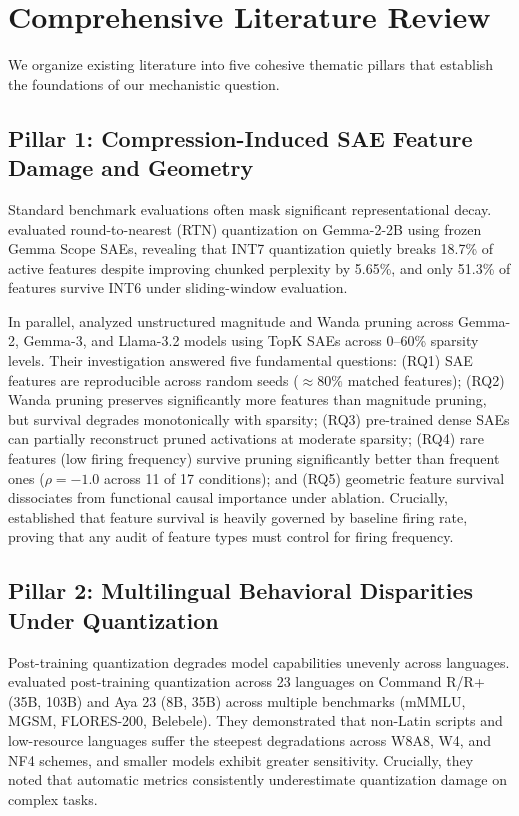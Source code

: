 \documentclass[11pt]{article}
\begin{document}
\section{Comprehensive Literature Review}
We organize existing literature into five cohesive thematic pillars that establish the foundations of our mechanistic question.

\subsection{Pillar 1: Compression-Induced SAE Feature Damage and Geometry}
Standard benchmark evaluations often mask significant representational decay. \citet{duan2026perplexity} evaluated round-to-nearest (RTN) quantization on Gemma-2-2B using frozen Gemma Scope SAEs, revealing that INT7 quantization quietly breaks 18.7\% of active features despite improving chunked perplexity by 5.65\%, and only 51.3\% of features survive INT6 under sliding-window evaluation. 

In parallel, \citet{borobia2026how} analyzed unstructured magnitude and Wanda pruning across Gemma-2, Gemma-3, and Llama-3.2 models using TopK SAEs across 0--60\% sparsity levels. Their investigation answered five fundamental questions: (RQ1) SAE features are reproducible across random seeds ($\approx 80\%$ matched features); (RQ2) Wanda pruning preserves significantly more features than magnitude pruning, but survival degrades monotonically with sparsity; (RQ3) pre-trained dense SAEs can partially reconstruct pruned activations at moderate sparsity; (RQ4) rare features (low firing frequency) survive pruning significantly better than frequent ones ($\rho = -1.0$ across 11 of 17 conditions); and (RQ5) geometric feature survival dissociates from functional causal importance under ablation. Crucially, \citet{borobia2026how} established that feature survival is heavily governed by baseline firing rate, proving that any audit of feature types must control for firing frequency.

\subsection{Pillar 2: Multilingual Behavioral Disparities Under Quantization}
Post-training quantization degrades model capabilities unevenly across languages. \citet{marchisio2024quantization} evaluated post-training quantization across 23 languages on Command R/R+ (35B, 103B) and Aya 23 (8B, 35B) across multiple benchmarks (mMMLU, MGSM, FLORES-200, Belebele). They demonstrated that non-Latin scripts and low-resource languages suffer the steepest degradations across W8A8, W4, and NF4 schemes, and smaller models exhibit greater sensitivity. Crucially, they noted that automatic metrics consistently underestimate quantization damage on complex tasks.
\end{document}
